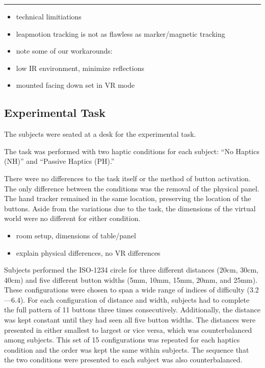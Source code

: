 \rule{0.75\textwidth}{1pt}
\begin{itemize}
  \item technical limitiations
  \item leapmotion tracking is not as flawless as marker/magnetic tracking
  \item note some of our workarounds:
  \item low IR environment, minimize reflections
  \item mounted facing down set in VR mode
\end{itemize}


\subsection{Experimental Task}

The subjects were seated at a desk for the experimental task.

The task was performed with two haptic conditions for each subject: ``No Haptics (NH)'' and ``Passive Haptics (PH).''

There were no differences to the task itself or the method of button activation.
The only difference between the conditions was the removal of the physical panel.
The hand tracker remained in the same location, preserving the location of the buttons.
Aside from the variations due to the task, the dimensions of the virtual world were no different for either condition.

\begin{itemize}
  \item room setup, dimensions of table/panel
  \item explain physical differences, no VR differences
\end{itemize}

Subjects performed the ISO-1234 circle for three different distances (20cm, 30cm, 40cm) and five different button widths (5mm, 10mm, 15mm, 20mm, and 25mm).
These configurations were chosen to span a wide range of indices of difficulty (3.2---6.4).
For each configuration of distance and width, subjects had to complete the full pattern of 11 buttons three times consecutively.
Additionally, the distance was kept constant until they had seen all five button widths.
The distances were presented in either smallest to largest or vice versa, which was counterbalanced among subjects.
This set of 15 configurations was repeated for each haptics condition and the order was kept the same within subjects.
The sequence that the two conditions were presented to each subject was also counterbalanced.

